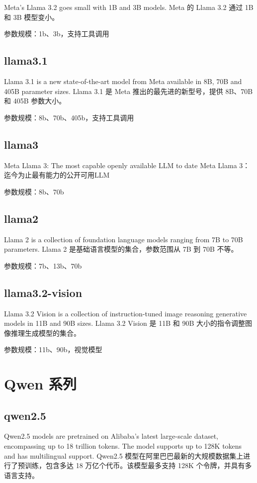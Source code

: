 \documentclass[12pt,UTF8]{ctexbook}
\begin{document}
Meta's Llama 3.2 goes small with 1B and 3B models.
Meta 的 Llama 3.2 通过 1B 和 3B 模型变小。

参数规模：1b、3b，支持工具调用

\subsection{llama3.1}

Llama 3.1 is a new state-of-the-art model from Meta available in 8B, 70B and 405B parameter sizes.
Llama 3.1 是 Meta 推出的最先进的新型号，提供 8B、70B 和 405B 参数大小。

参数规模：8b、70b、405b，支持工具调用

\subsection{llama3}

Meta Llama 3: The most capable openly available LLM to date
Meta Llama 3：迄今为止最有能力的公开可用LLM

参数规模：8b、70b

\subsection{llama2}

Llama 2 is a collection of foundation language models ranging from 7B to 70B parameters.
Llama 2 是基础语言模型的集合，参数范围从 7B 到 70B 不等。

参数规模：7b、13b、70b

\subsection{llama3.2-vision}

Llama 3.2 Vision is a collection of instruction-tuned image reasoning generative models in 11B and 90B sizes.
Llama 3.2 Vision 是 11B 和 90B 大小的指令调整图像推理生成模型的集合。

参数规模：11b、90b，视觉模型

\section{Qwen 系列}

\subsection{qwen2.5}

Qwen2.5 models are pretrained on Alibaba's latest large-scale dataset, encompassing up to 18 trillion tokens. The model supports up to 128K tokens and has multilingual support.
Qwen2.5 模型在阿里巴巴最新的大规模数据集上进行了预训练，包含多达 18 万亿个代币。该模型最多支持 128K 个令牌，并具有多语言支持。
\end{document}

